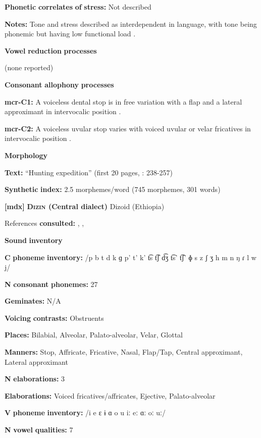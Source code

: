 \begin{styleBody}
\textbf{Phonetic} \textbf{correlates} \textbf{of} \textbf{stress:} Not described

\textbf{Notes:} Tone and stress described as interdependent in language, with tone being phonemic but having low functional load \citep[226]{Whitehead2004}. 

\textbf{Vowel} \textbf{reduction} \textbf{processes}

(none reported)

\textbf{Consonant} \textbf{allophony} \textbf{processes}

\textbf{mcr-C1:} A voiceless dental stop is in free variation with a flap and a lateral approximant in intervocalic position \citep[9]{Whitehead2004}.

\textbf{mcr-C2:} A voiceless uvular stop varies with voiced uvular or velar fricatives in intervocalic position \citep[9]{Whitehead2004}.

\textbf{Morphology}

\textbf{Text:} “Hunting expedition” (first 20 pages, \citealt{Whitehead2004}: 238-257)

\textbf{Synthetic} \textbf{index:} 2.5 morphemes/word (745 morphemes, 301 words)

\textbf{[mdx]}   \textbf{\textsc{Dizin} \textbf{(Central} \textbf{dialect)}}  Dizoid (Ethiopia)

References \textbf{consulted:} \citet{Allan1976}, \citet{Beachy2005}, \citet{Breeze1988}

\textbf{Sound} \textbf{inventory}

\textbf{C} \textbf{phoneme} \textbf{inventory:} /p b t d k ɡ p’ t’ k’ t͡s t͡ʃ d͡ʒ t͡s’ t͡ʃ’ ɸ s z ʃ ʒ h m n ŋ ɾ l w j/

\textbf{N} \textbf{consonant} \textbf{phonemes:} 27

\textbf{Geminates:} N/A

\textbf{Voicing} \textbf{contrasts:} Obstruents

\textbf{Places:} Bilabial, Alveolar, Palato-alveolar, Velar, Glottal

\textbf{Manners:} Stop, Affricate, Fricative, Nasal, Flap/Tap, Central approximant, Lateral approximant

\textbf{N} \textbf{elaborations:} 3

\textbf{Elaborations:} Voiced fricatives/affricates, Ejective, Palato-alveolar

\textbf{V} \textbf{phoneme} \textbf{inventory:} /i e ɛ ɨ ɑ o u iː eː ɑː oː uː/

\textbf{N} \textbf{vowel} \textbf{qualities:} 7


\end{styleBody}
